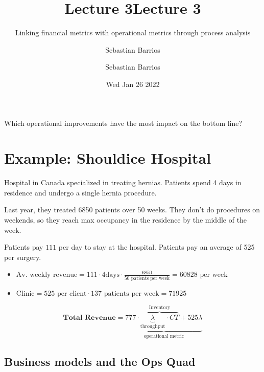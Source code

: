 \documentclass[
  paper=a4,
,captions=tableheading
]{scrartcl}
\title{Lecture 3}
\subtitle{Linking financial metrics with operational metrics through
process analysis}
\author{Sebastian Barrios}
\date{Wed Jan 26 2022}
\title{Lecture 3}
\author{Sebastian Barrios}
\providecommand{\tightlist}{%
  \setlength{\itemsep}{0pt}\setlength{\parskip}{0pt}}
\renewenvironment{quote}{\begin{customblockquote}\list{}{\rightmargin=0em\leftmargin=0em}%
\item\relax\color{blockquote-text}\ignorespaces}{\unskip\unskip\endlist\end{customblockquote}}
\begin{document}




\begin{quote}
Which operational improvements have the most impact on the bottom line?
\end{quote}

\hypertarget{example-shouldice-hospital}{%
\section{Example: Shouldice Hospital}\label{example-shouldice-hospital}}

Hospital in Canada specialized in treating hernias. Patients spend 4
days in residence and undergo a single hernia procedure.

Last year, they treated 6850 patients over 50 weeks. They don't do
procedures on weekends, so they reach max occupancy in the residence by
the middle of the week.

Patients pay \(111\) per day to stay at the hospital. Patients pay an
average of 525 per surgery.

\begin{itemize}
\tightlist
\item
  \(\text{Av. weekly revenue} = 111 \cdot 4\text{days} \cdot \frac{6850}{50\text{ patients per week}} = 60828 \text{ per week}\)
\item
  \(\text{Clinic} = 525 \text{ per client} \cdot 137 \text{ patients per week} = 71925\)
\end{itemize}

\[
\textbf{Total Revenue} = \underbrace{777 \cdot \overbrace{\underbrace{\lambda}_{\text{throughput}} \cdot CT }^{\text{Inventory}} + 525 \lambda}_{\text{operational metric}}
\]

\hypertarget{business-models-and-the-ops-quad}{%
\subsection{Business models and the Ops
Quad}\label{business-models-and-the-ops-quad}}
\end{document}
